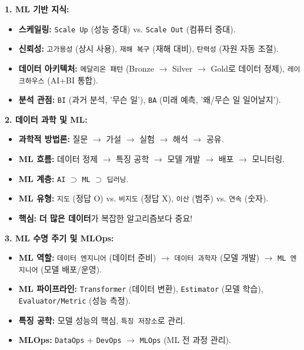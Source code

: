 \documentclass[11pt,a4paper]{article}
\begin{document}
\begin{tcolorbox}[summarybox={CSCI103 Lecture 8: 재현 가능한 머신러닝 핵심 요약}]
\textbf{1. ML 기반 지식:}
\begin{itemize}
    \item \textbf{스케일링:} \texttt{Scale Up} (성능 증대) vs. \texttt{Scale Out} (컴퓨터 증대).
    \item \textbf{신뢰성:} \texttt{고가용성} (상시 사용), \texttt{재해 복구} (재해 대비), \texttt{탄력성} (자원 자동 조절).
    \item \textbf{데이터 아키텍처:} \texttt{메달리온 패턴} (Bronze $\rightarrow$ Silver $\rightarrow$ Gold로 데이터 정제), \texttt{레이크하우스} (AI+BI 통합).
    \item \textbf{분석 관점:} \texttt{BI} (과거 분석, '무슨 일'), \texttt{BA} (미래 예측, '왜/무슨 일 일어날지').
\end{itemize}

\textbf{2. 데이터 과학 및 ML:}
\begin{itemize}
    \item \textbf{과학적 방법론:} 질문 $\rightarrow$ 가설 $\rightarrow$ 실험 $\rightarrow$ 해석 $\rightarrow$ 공유.
    \item \textbf{ML 흐름:} 데이터 정제 $\rightarrow$ 특징 공학 $\rightarrow$ 모델 개발 $\rightarrow$ 배포 $\rightarrow$ 모니터링.
    \item \textbf{ML 계층:} \texttt{AI} $\supset$ \texttt{ML} $\supset$ \texttt{딥러닝}.
    \item \textbf{ML 유형:} \texttt{지도} (정답 O) vs. \texttt{비지도} (정답 X), \texttt{이산} (범주) vs. \texttt{연속} (숫자).
    \item \textbf{핵심:} \textbf{더 많은 데이터}가 복잡한 알고리즘보다 중요!
\end{itemize}

\textbf{3. ML 수명 주기 및 MLOps:}
\begin{itemize}
    \item \textbf{ML 역할:} \texttt{데이터 엔지니어} (데이터 준비) $\rightarrow$ \texttt{데이터 과학자} (모델 개발) $\rightarrow$ \texttt{ML 엔지니어} (모델 배포/운영).
    \item \textbf{ML 파이프라인:} \texttt{Transformer} (데이터 변환), \texttt{Estimator} (모델 학습), \texttt{Evaluator/Metric} (성능 측정).
    \item \textbf{특징 공학:} 모델 성능의 핵심, \texttt{특징 저장소}로 관리.
    \item \textbf{MLOps:} \texttt{DataOps} + \texttt{DevOps} $\rightarrow$ \texttt{MLOps} (ML 전 과정 관리).
\end{itemize}


\end{tcolorbox}
\end{document}
